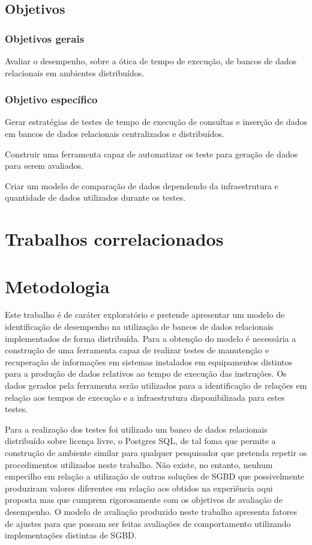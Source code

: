\documentclass[12pt, a4paper]{article}
\begin{document}
\subsection{Objetivos}

\subsubsection{Objetivos gerais}
Avaliar o desempenho, sobre a ótica de tempo de execução, de bancos de dados relacionais em ambientes distribuídos.

\subsubsection{Objetivo específico}
Gerar estratégias de testes de tempo de execução de consultas e inserção de dados em bancos de dados relacionais 
centralizados e distribuídos.

Construir uma ferramenta capaz de automatizar os teste para geração de dados para serem avaliados.

Criar um modelo de comparação de dados dependendo da infraestrutura e quantidade de dados utilizados durante os testes.

\section{Trabalhos correlacionados}

\section{Metodologia}

Este trabalho é de caráter exploratório e pretende apresentar um modelo de identificação de desempenho na
utilização de bancos de dados relacionais implementados de forma distribuída. Para a obtenção do modelo
é necessária a construção de uma ferramenta capaz de realizar testes de manutenção e recuperação de informações
em sistemas instalados em equipamentos distintos para a produção de dados relativos ao tempo de execução das
instruções. Os dados gerados pela ferramenta serão utilizados para a identificação de relações em relação aos
tempos de execução e a infraestrutura disponibilizada para estes testes.

Para a realização dos testes foi utilizado um banco de dados relacionais distribuído sobre licença livre, o 
Postgres SQL, de tal foma que permite a construção de ambiente similar para qualquer pesquisador que pretenda 
repetir os procedimentos utilizados neste trabalho. Não existe, no entanto, nenhum empecilho em relação a 
utilização de outras soluções de SGBD que possivelmente produziram valores diferentes em relação aos obtidos 
na experiência aqui proposta mas que cumprem rigorosamente com os objetivos de avaliação de
desempenho. O modelo de avaliação produzido neste trabalho apresenta fatores de ajustes para que possam ser
feitas avaliações de comportamento utilizando implementações distintas de SGBD.
\end{document}
